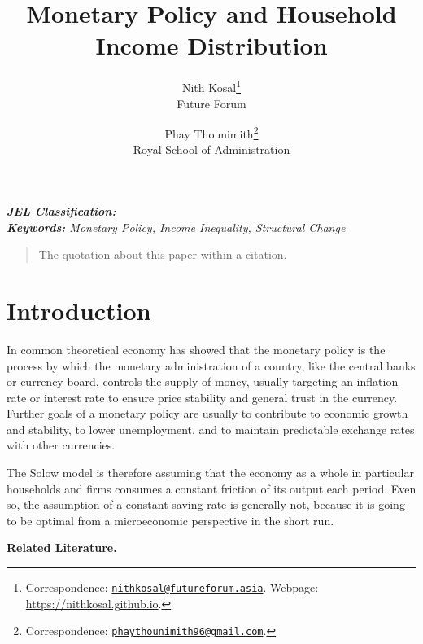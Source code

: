 \documentclass[11pt,letterpaper]{article}
\author{Nith Kosal\footnote{Correspondence: \href{mailto:nithkosal@futureforum.asia}{\texttt{nithkosal@futureforum.asia}}. Webpage: \url{https://nithkosal.github.io}.} \\
	\small{Future Forum}  
	\and
	Phay Thounimith\footnote{Correspondence: \href{mailto:phaythounimith96@gmail.com }{\texttt{phaythounimith96@gmail.com}}.}  \\
	\small{Royal School of Administration}  
}
\title{Monetary Policy and Household Income Distribution}
\begin{document}
	
	
	 
\maketitle
	\begin{abstract}
		    
	\end{abstract}
	\textit{\textbf{JEL Classification:}} \\
	\textit{\textbf{Keywords:} Monetary Policy, Income Inequality, Structural Change}
	
	\clearpage
\begin{quotation}
	The quotation about this paper within a citation. 
\end{quotation}
\section{Introduction}\label{sec:intro}

In common theoretical economy has showed that the monetary policy is the process by which the monetary administration of a country, like the central banks or currency board, controls the supply of money, usually targeting an inflation rate or interest rate to ensure price stability and general trust in the currency. Further goals of a monetary policy are usually to contribute to economic growth and stability, to lower unemployment, and to maintain predictable exchange rates with other currencies.
 
The Solow model is therefore assuming that the economy as a whole in particular households and firms consumes a constant friction of its output each period. Even so, the assumption of a constant saving rate is generally not, because it is going to be optimal from a microeconomic perspective in the short run.  



\textbf{Related Literature. }
\end{document}
